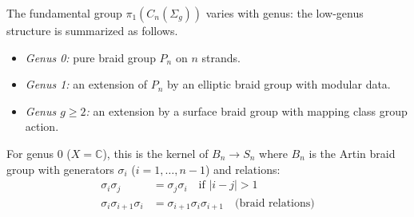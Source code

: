 \begin{proposition}
\label{prop:fundamental-group-genera}
The fundamental group $\pi_1(C_n(\Sigma_g))$ varies with genus:
the low-genus structure is summarized as follows.
\begin{itemize}
\item \emph{Genus 0:} pure braid group $P_n$ on $n$ strands.
\item \emph{Genus 1:} an extension of $P_n$ by an elliptic braid group with modular data.
\item \emph{Genus $g \geq 2$:} an extension by a surface braid group with mapping class group action.
\end{itemize}

For genus 0 ($X = \mathbb{C}$), this is the kernel of $B_n \to S_n$ where $B_n$ is the Artin braid group with generators $\sigma_i$ ($i = 1, \ldots, n-1$) and relations:
\begin{align}
\sigma_i\sigma_j &= \sigma_j\sigma_i \quad \text{if } |i-j| > 1 \\
\sigma_i\sigma_{i+1}\sigma_i &= \sigma_{i+1}\sigma_i\sigma_{i+1} \quad \text{(braid relations)}
\end{align}
\end{proposition}


